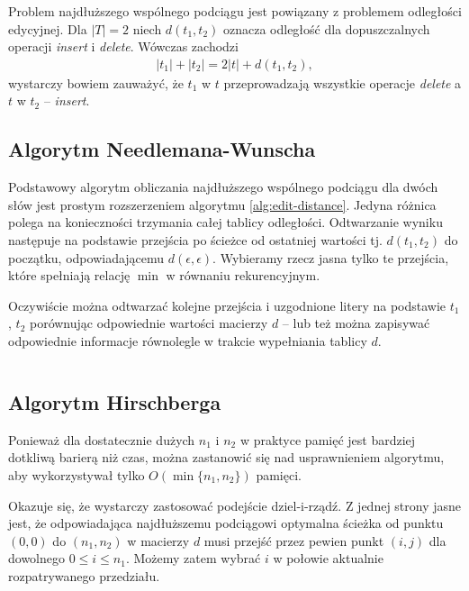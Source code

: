 Problem najdłuższego wspólnego podciągu jest powiązany z problemem odległości edycyjnej.
Dla $|T| = 2$ niech $d(t_1, t_2)$ oznacza odległość dla dopuszczalnych operacji \emph{insert} i \emph{delete}.
Wówczas zachodzi
\begin{align*}
    |t_1| + |t_2| = 2 |t| + d(t_1, t_2),
\end{align*}
wystarczy bowiem zauważyć, że $t_1$ w $t$ przeprowadzają wszystkie operacje \emph{delete} a $t$ w $t_2$ -- \emph{insert}.

\subsection{Algorytm Needlemana-Wunscha}

Podstawowy algorytm obliczania najdłuższego wspólnego podciągu dla dwóch słów jest prostym rozszerzeniem algorytmu \ref{alg:edit-distance}. Jedyna różnica polega na konieczności trzymania całej tablicy odległości.
Odtwarzanie wyniku następuje na podstawie przejścia po ścieżce od ostatniej wartości tj. $d(t_1, t_2)$ do początku, odpowiadającemu $d(\epsilon, \epsilon)$.
Wybieramy rzecz jasna tylko te przejścia, które spełniają relację $\min$ w równaniu rekurencyjnym.

Oczywiście można odtwarzać kolejne przejścia i uzgodnione litery na podstawie $t_1$, $t_2$ porównując odpowiednie wartości macierzy $d$ -- lub też można zapisywać odpowiednie informacje równolegle w trakcie wypełniania tablicy $d$.

\begin{code}
\inputminted{python}{code/approximate-string-matching/needleman-wunsch.py}
\label{alg:lcs-needleman-wunsch}
\end{code}

\subsection{Algorytm Hirschberga}

Ponieważ dla dostatecznie dużych $n_1$ i $n_2$ w praktyce pamięć jest bardziej dotkliwą barierą niż czas, można zastanowić się nad usprawnieniem algorytmu, aby wykorzystywał tylko $O(\min\{n_1, n_2\})$ pamięci.

Okazuje się, że wystarczy zastosować podejście dziel-i-rządź. Z jednej strony jasne jest, że odpowiadająca najdłuższemu podciągowi optymalna ścieżka od punktu $(0, 0)$ do $(n_1, n_2)$ w macierzy $d$ musi przejść przez pewien punkt $(i, j)$ dla dowolnego $0 \le i \le n_1$. Możemy zatem wybrać $i$ w połowie aktualnie rozpatrywanego przedziału.

